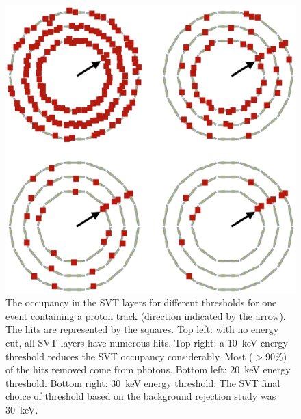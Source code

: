 \begin{figure}[ht]
	\centering
	\includegraphics[width=0.99\columnwidth,keepaspectratio]{img/bstHitDisplay.png}
	\caption{The occupancy in the SVT layers for different thresholds for one event containing a proton track
          (direction indicated by the arrow). The hits are represented by the squares. Top left: with no energy cut, all SVT
          layers have numerous hits. Top right: a 10~keV energy threshold reduces the SVT occupancy considerably. Most
          ($>$90\%) of the hits removed come from photons. Bottom left: 20~keV energy threshold. Bottom right: 30~keV
          energy threshold. The SVT final choice of threshold based on the background rejection study was 30~keV.}
	\label{fig:radStudyThreshold}
\end{figure}

